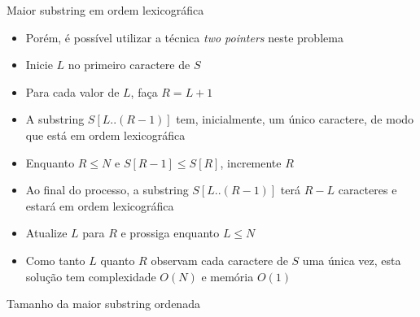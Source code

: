 \begin{frame}[fragile]{Maior substring em ordem lexicográfica}

    \begin{itemize}
        \item Porém, é possível utilizar a técnica \textit{two pointers} neste problema

        \item Inicie $L$ no primeiro caractere de $S$

        \item Para cada valor de $L$, faça $R = L + 1$

        \item A substring $S[L..(R - 1)]$ tem, inicialmente, um único caractere, de modo que
            está em ordem lexicográfica

        \item Enquanto $R\leq N$ e $S[R - 1] \leq S[R]$, incremente $R$

        \item Ao final do processo, a substring $S[L..(R - 1)]$ terá $R - L$ caracteres e estará
            em ordem lexicográfica

        \item Atualize $L$ para $R$ e prossiga enquanto $L\leq N$

        \item Como tanto $L$ quanto $R$ observam cada caractere de $S$ uma única vez, esta 
            solução tem complexidade $O(N)$ e memória $O(1)$
    \end{itemize}

\end{frame}

\begin{frame}[fragile]{Tamanho da maior substring ordenada}
\end{frame}


